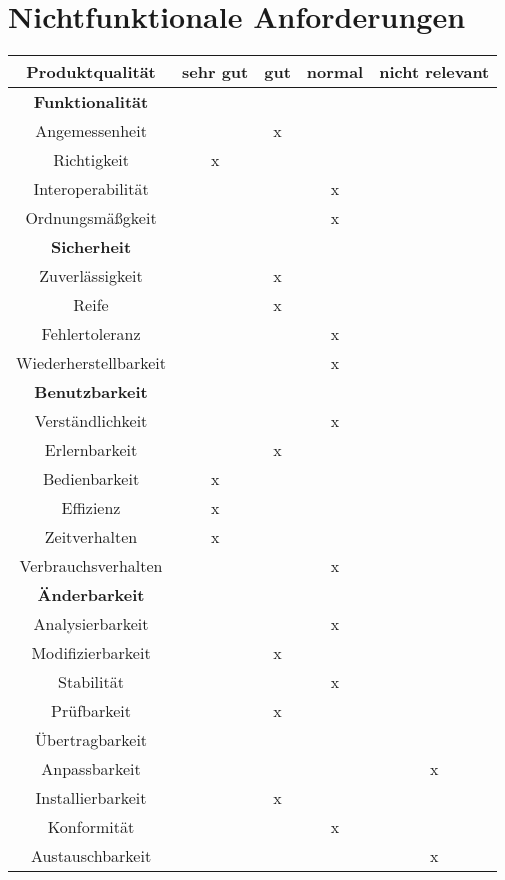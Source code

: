 
\chapter{Nichtfunktionale Anforderungen}


\begin{tabular}{|c|c|c|c|c|}
  \hline                                              %

  \textbf{Produktqualität}  & \textbf{sehr gut}  &    \textbf{gut}  &
  \textbf{normal}           & \textbf{nicht relevant}  \\  %
  \hline                                              %

  \textbf{Funktionalität}  &&&&\\        %
  \hline
Angemessenheit&&x&&\\
\hline
Richtigkeit&x&&&\\
\hline
Interoperabilität&&&x&\\
\hline
Ordnungsmäßgkeit&&&x&\\
\hline
\textbf{Sicherheit}&&&&\\
\hline
Zuverlässigkeit&&x&&\\
\hline
Reife&&x&&\\
\hline
Fehlertoleranz&&&x&\\
\hline
Wiederherstellbarkeit&&&x&\\
\hline
\textbf{Benutzbarkeit}&&&&\\
\hline
Verständlichkeit&&&x&\\
\hline
Erlernbarkeit&&x&&\\
\hline
Bedienbarkeit&x&&&\\
\hline
Effizienz&x&&&\\
\hline
Zeitverhalten&x&&&\\
\hline
Verbrauchsverhalten&&&x&\\
\hline
\textbf{Änderbarkeit}&&&&\\
\hline
Analysierbarkeit&&&x&\\
\hline
Modifizierbarkeit&&x&&\\
\hline
Stabilität&&&x&\\
\hline
Prüfbarkeit&&x&&\\
\hline
Übertragbarkeit&&&&\\
\hline
Anpassbarkeit&&&&x\\
\hline
Installierbarkeit&&x&&\\
\hline
Konformität&&&x&\\
\hline
Austauschbarkeit&&&&x\\
\hline
\end{tabular}

